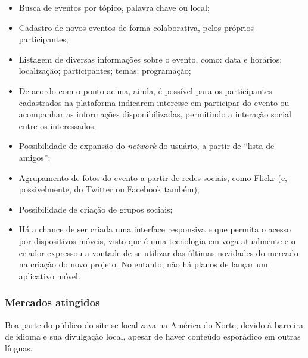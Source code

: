 \documentclass[12pt,a4paper,twoside,hyphens,english,brazil]{abntex2}
\begin{document}
\begin{itemize}[itemsep=-1ex]
	\item Busca de eventos por tópico, palavra chave ou local;
	\item Cadastro de novos eventos de forma colaborativa, pelos próprios participantes;
	\item Listagem de diversas informações sobre o evento, como: data e horários; localização; participantes; temas; programação;
	\item De acordo com o ponto acima, ainda, é possível para os participantes cadastrados na plataforma indicarem interesse em participar do evento ou acompanhar as informações disponibilizadas, permitindo a interação social entre os interessados;
	\item Possibilidade de expansão do \emph{network} do usuário, a partir de ``lista de amigos'';
	\item Agrupamento de fotos do evento a partir de redes sociais, como Flickr (e, possivelmente, do Twitter ou Facebook também);
	\item Possibilidade de criação de grupos sociais;
	\item Há a chance de ser criada uma interface responsiva e que permita o acesso por dispositivos móveis, visto que é uma tecnologia em voga atualmente e o criador expressou a vontade de se utilizar das últimas novidades do mercado na criação do novo projeto. No entanto, não há planos de lançar um aplicativo móvel\cite{upcoming-90-min}.
\end{itemize}

\subsubsection*{Mercados atingidos}
Boa parte do público do site se localizava na América do Norte, devido à barreira de idioma e sua divulgação local, apesar de haver conteúdo esporádico em outras línguas.

\end{document}
